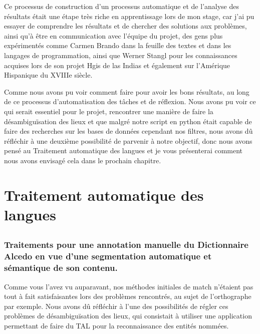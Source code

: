 \documentclass[a4paper,12pt,twoside]{book}
\begin{document}
Ce processus de construction d’un processus automatique et de l’analyse des résultats était une étape très riche  en apprentissage lors de mon stage, car j’ai pu essayer de comprendre les résultats et de chercher des solutions aux problèmes, ainsi qu’à être en communication avec l’équipe du projet, des gens plus expérimentés comme Carmen Brando dans la feuille des textes et dans les langages de programmation, ainsi que Werner Stangl pour les connaissances acquises lors de son projet Hgis de las Indias et également sur l’Amérique Hispanique du XVIIIe siècle.

Comme nous avons pu voir comment faire pour avoir les bons résultats, au long de ce processus d’automatisation des tâches et de réflexion. Nous avons pu voir ce qui serait essentiel pour le projet, rencontrer une manière de faire la désambiguïsation des lieux et que malgré notre script en python était capable de faire des recherches sur les bases de données cependant nos filtres, nous avons dû réfléchir à une deuxième possibilité de parvenir à notre objectif, donc nous avons pensé au Traitement automatique des langues et je vous présenterai comment nous avons envisagé cela dans le prochain chapitre.  

\part{Traitement automatique des langues}
	
	\chapter{}
	\section{Traitements pour une annotation manuelle du Dictionnaire Alcedo en vue d’une segmentation automatique et sémantique de son contenu.}
	
Comme vous l’avez vu auparavant, nos méthodes initiales de match n’étaient pas tout à fait satisfaisantes lors des problèmes rencontrés, au sujet de l’orthographe par exemple. Nous avons dû réfléchir à l’une des possibilités de régler ces problèmes de désambiguïsation des lieux, qui consistait à utiliser une application permettant de faire du \Gls{TAL} pour la reconnaissance des entités nommées.
\end{document}
